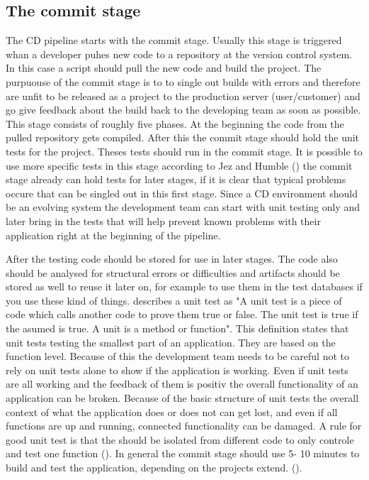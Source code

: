 \subsection{The commit stage}
The CD pipeline starts with the commit stage. Usually this stage is triggered whan a developer puhes new code to a repository at the version control system.
In this case a script should pull the new code and build the project. The purpuouse of the commit stage is to to single out builds with errors and therefore
are unfit to be released as a project to the production server (user/customer) and go give feedback about the build back to the developing team as soon as possible.
This stage consists of roughly five phases. At the beginning the code from the pulled repository gets compiled. After this the commit stage should hold the unit
tests for the project. Theses tests should run in the commit stage. It is possible to use more specific tests in this stage according to Jez and Humble
(\cite{humble2010continuous}) the commit stage already can hold tests for later stages, if it is clear that typical problems occure that can be singled out
in this first stage. Since a CD environment should be an evolving system the development team can start with unit testing only and later bring in the tests
that will help prevent known problems with their application right at the beginning of the pipeline.

After the testing code should be stored for use in later stages. The code also should be analysed for structural errors or difficulties and
artifacts should be stored as well to reuse it later on, for example to use them in the test databases if you use these kind of things. \cite{osherove2015art}
describes a unit test as "A unit test is a piece of code which calls another code to prove them true or false. The unit test is true if the asumed is true.
A unit is a method or function". This definition states that unit tests testing the smallest part of an application. They are based on the function level.
Because of this the development team needs to be careful not to rely on unit tests alone to show if the application is working. Even if unit tests are all
working and the feedback of them is positiv the overall functionality of an application can be broken. Because of the basic structure of unit tests the
overall context of what the application does or does not can get lost, and even if all functions are up and running, connected functionality can be damaged.
A rule for good unit test is that the should be isolated from different code to only controle and test one function (\cite{osherove2015art}).
In general the commit stage should use 5- 10 minutes to build and test the application, depending on the projects extend. (\cite{humble2010continuous}).

